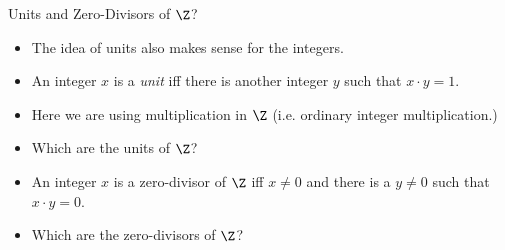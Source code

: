 \documentclass{beamer}
\begin{document}
\begin{frame}{Units and Zero-Divisors of $\Z$?}
\begin{itemize}
  \item The idea of units also makes sense for the integers.
  \item An integer $x$ is a \emph{unit} iff there is another integer $y$ such
  that $x\cdot y = 1$.
  \item Here we are using multiplication in $\Z$ (i.e. ordinary integer multiplication.)
  \item Which are the units of $\Z$?
  \item An integer $x$ is a zero-divisor of $\Z$ iff $x\not=0$ and there is a $y\not=0$
  such that $x\cdot y = 0$.
  \item Which are the zero-divisors of $\Z$?
\end{itemize}
\end{frame}
\end{document}
